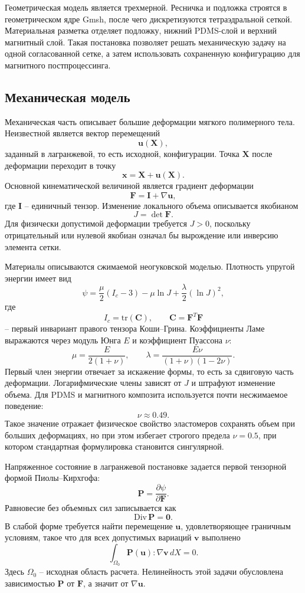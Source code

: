 \documentclass[12pt,a4paper]{article}
\begin{document}
Геометрическая модель является трехмерной. Ресничка и подложка строятся в
геометрическом ядре Gmsh, после чего дискретизуются тетраэдральной сеткой.
Материальная разметка отделяет подложку, нижний PDMS-слой и верхний магнитный
слой. Такая постановка позволяет решать механическую задачу на одной
согласованной сетке, а затем использовать сохраненную конфигурацию для
магнитного постпроцессинга.

\subsection{Механическая модель}

Механическая часть описывает большие деформации мягкого полимерного тела.
Неизвестной является вектор перемещений
\[
    \mathbf u(\mathbf X),
\]
заданный в лагранжевой, то есть исходной, конфигурации. Точка
\(\mathbf X\) после деформации переходит в точку
\[
    \mathbf x = \mathbf X + \mathbf u(\mathbf X).
\]
Основной кинематической величиной является градиент деформации
\[
    \mathbf F = \mathbf I + \nabla \mathbf u,
\]
где \(\mathbf I\) -- единичный тензор. Изменение локального объема описывается
якобианом
\[
    J = \det \mathbf F.
\]
Для физически допустимой деформации требуется \(J>0\), поскольку отрицательный
или нулевой якобиан означал бы вырождение или инверсию элемента сетки.

Материалы описываются сжимаемой неогуковской моделью. Плотность упругой энергии
имеет вид
\[
    \psi =
    \frac{\mu}{2}(I_c - 3)
    -
    \mu \ln J
    +
    \frac{\lambda}{2}(\ln J)^2,
\]
где
\[
    I_c = \mathrm{tr}(\mathbf C), \qquad
    \mathbf C = \mathbf F^{T}\mathbf F
\]
-- первый инвариант правого тензора Коши--Грина. Коэффициенты Ламе выражаются
через модуль Юнга \(E\) и коэффициент Пуассона \(\nu\):
\[
    \mu = \frac{E}{2(1+\nu)}, \qquad
    \lambda =
    \frac{E\nu}{(1+\nu)(1-2\nu)}.
\]
Первый член энергии отвечает за искажение формы, то есть за сдвиговую часть
деформации. Логарифмические члены зависят от \(J\) и штрафуют изменение объема.
Для PDMS и магнитного композита используется почти несжимаемое поведение:
\[
    \nu \approx 0.49.
\]
Такое значение отражает физическое свойство эластомеров сохранять объем при
больших деформациях, но при этом избегает строгого предела \(\nu=0.5\), при
котором стандартная формулировка становится сингулярной.

Напряженное состояние в лагранжевой постановке задается первой тензорной формой
Пиолы--Кирхгофа:
\[
    \mathbf P = \frac{\partial \psi}{\partial \mathbf F}.
\]
Равновесие без объемных сил записывается как
\[
    \mathrm{Div}\,\mathbf P = \mathbf 0.
\]
В слабой форме требуется найти перемещение \(\mathbf u\), удовлетворяющее
граничным условиям, такое что для всех допустимых вариаций \(\mathbf v\)
выполнено
\[
    \int_{\Omega_0} \mathbf P(\mathbf u) : \nabla \mathbf v\,dX = 0.
\]
Здесь \(\Omega_0\) -- исходная область расчета. Нелинейность этой задачи
обусловлена зависимостью \(\mathbf P\) от \(\mathbf F\), а значит от
\(\nabla\mathbf u\).
\end{document}
